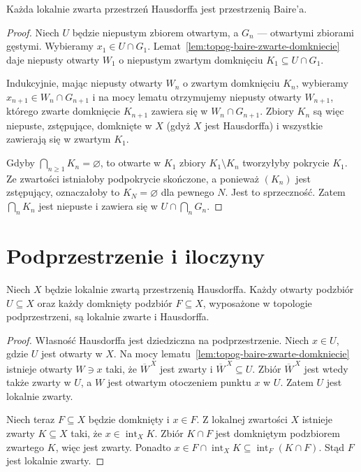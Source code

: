 \begin{twierdzenie}
\label{thm:topog-baire-lokalnie-zwarte}
Każda lokalnie zwarta przestrzeń Hausdorffa
jest przestrzenią Baire'a.
\end{twierdzenie}
\begin{proof}
Niech $U$ będzie niepustym zbiorem otwartym,
a $G_n$ --- otwartymi zbiorami gęstymi.
Wybieramy $x_1\in U\cap G_1$.
Lemat~\ref{lem:topog-baire-zwarte-domkniecie}
daje niepusty otwarty $W_1$ o niepustym
zwartym domknięciu $K_1\subseteq U\cap G_1$.

Indukcyjnie, mając niepusty otwarty $W_n$
o zwartym domknięciu $K_n$, wybieramy
$x_{n+1}\in W_n\cap G_{n+1}$
i na mocy lematu otrzymujemy niepusty otwarty
$W_{n+1}$, którego zwarte domknięcie
$K_{n+1}$ zawiera się w $W_n\cap G_{n+1}$.
Zbiory $K_n$ są więc niepuste, zstępujące,
domknięte w $X$ (gdyż $X$ jest Hausdorffa)
i wszystkie zawierają się w zwartym $K_1$.

Gdyby $\bigcap_{n\ge1}K_n=\varnothing$,
to otwarte w $K_1$ zbiory $K_1\setminus K_n$
tworzyłyby pokrycie $K_1$. Ze zwartości
istniałoby podpokrycie skończone,
a ponieważ $(K_n)$ jest zstępujący,
oznaczałoby to $K_N=\varnothing$ dla
pewnego $N$. Jest to sprzeczność.
Zatem $\bigcap_nK_n$ jest niepuste
i zawiera się w $U\cap\bigcap_nG_n$.
\end{proof}


\section{Podprzestrzenie i iloczyny}
\label{sec:topog-lokalna-podprzestrzenie}

\begin{stwierdzenie}
\label{prop:topog-lokalna-podprzestrzenie}
Niech $X$ będzie lokalnie zwartą przestrzenią Hausdorffa.
Każdy otwarty podzbiór $U\subseteq X$ oraz każdy
domknięty podzbiór $F\subseteq X$, wyposażone
w topologie podprzestrzeni, są lokalnie zwarte
i Hausdorffa.
\end{stwierdzenie}
\begin{proof}
Własność Hausdorffa jest dziedziczna na podprzestrzenie.
Niech $x\in U$, gdzie $U$ jest otwarty w $X$.
Na mocy lematu~\ref{lem:topog-baire-zwarte-domkniecie}
istnieje otwarty $W\ni x$ taki, że
$\overline W^{\,X}$ jest zwarty
i $\overline W^{\,X}\subseteq U$.
Zbiór $\overline W^{\,X}$ jest wtedy także
zwarty w $U$, a $W$ jest otwartym otoczeniem
punktu $x$ w $U$.
Zatem $U$ jest lokalnie zwarty.

Niech teraz $F\subseteq X$ będzie domknięty
i $x\in F$. Z lokalnej zwartości $X$
istnieje zwarty $K\subseteq X$ taki, że
$x\in\operatorname{int}_X K$.
Zbiór $K\cap F$ jest domkniętym podzbiorem
zwartego $K$, więc jest zwarty.
Ponadto
$x\in F\cap\operatorname{int}_X K
\subseteq\operatorname{int}_F(K\cap F)$.
Stąd $F$ jest lokalnie zwarty.
\end{proof}


